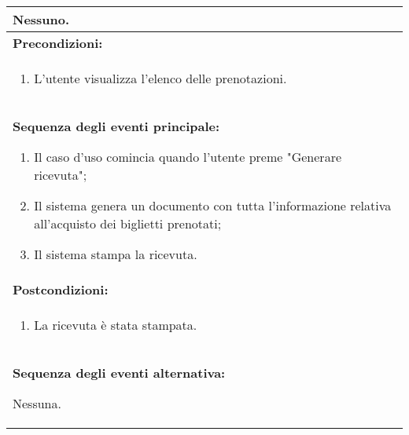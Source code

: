 \documentclass{article}
\begin{document}
\begin{table}[t]
\begin{tabular}{|p{\linewidth}|}
        Nessuno. \\
        \hline
        \cellcolor{gray!20}
        \textbf{Precondizioni:} \\
        \cellcolor{gray!20}
        \begin{minipage}{\linewidth}
            \begin{enumerate}
                \item L'utente visualizza l'elenco delle prenotazioni. %
            \end{enumerate}
        \end{minipage} \\
        \hline
        \textbf{Sequenza degli eventi principale:}
        \begin{enumerate}
            \item Il caso d'uso comincia quando l'utente preme "Generare ricevuta";
            \item Il sistema genera un documento con tutta l'informazione relativa all'acquisto dei biglietti prenotati;
            \item Il sistema stampa la ricevuta.
        \end{enumerate} \\
        \hline
        \cellcolor{gray!20}
        \textbf{Postcondizioni:} \\
        \cellcolor{gray!20}
        \begin{minipage}{\linewidth}
            \begin{enumerate}
                \item La ricevuta è stata stampata.
            \end{enumerate}
        \end{minipage} \\
        \hline
        \textbf{Sequenza degli eventi alternativa:}
        
        Nessuna. \\
        \hline
    \end{tabular}
\end{table}


\end{document}
